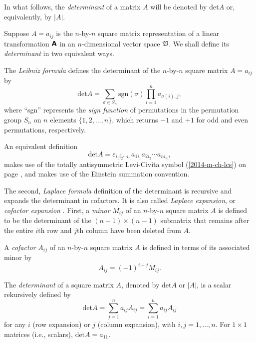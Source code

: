 In what follows, the {\em determinant} of a matrix $A$ will be denoted by $\textrm{det} A$ or,
equivalently, by $\vert A \vert$.

Suppose $A=a_{ij}$ is the  $n$-by-$n$ square matrix representation of
a linear transformation $\textsf{\textbf{A}}$
in an $n$-dimensional vector space ${\frak V}$.
We shall define its {\em determinant}
in two equivalent ways.


The
{\em Leibniz formula}
 defines the determinant of the $n$-by-$n$ square matrix  $A=a_{ij}$ by
\begin{equation}
\textrm{det}A
=\sum_{\sigma \in S_n} \textrm{sgn}(\sigma) \prod_{i=1}^n a_{\sigma(i),j} ,
\end{equation}
where ``sgn'' represents the {\em sign function}
of permutations in the permutation group $S_n$
on $n$ elements $\{1,2, \ldots , n\}$,
which returns $-1$ and $+1$ for odd and even permutations,
respectively.

An equivalent definition
\begin{equation}
\textrm{det}A
=\varepsilon_{i_1 i_2\cdots i_n} a_{1i_1}a_{2i_2} \cdots a_{ni_n},
\end{equation}
makes use of the  totally antisymmetric Levi-Civita symbol  (\ref{2014-m-ch-lcs}) on page \pageref{2014-m-ch-lcs},
 and makes use of the
 Einstein summation convention.


The second,
{\em Laplace formula}
definition of the determinant
is recursive and expands the determinant in cofactors.
It is also called
{\em Laplace expansion},
or
{\em cofactor expansion}
.
First,
a {\em minor}
$M_{ij}$ of an  $n$-by-$n$ square matrix  $A$ is
defined to be the determinant of the
$(n-1)\times (n-1)$ submatrix
that remains after the entire $i$th row and $j$th column have been deleted from $A$.

A {\em cofactor}
$A_{ij}$
of an $n$-by-$n$ square matrix  $A$
is defined in terms of its associated minor by
\begin{equation}
A_{ij}=(-1)^{i+j}M_{ij}.
\end{equation}

The {\em determinant} of a square matrix $A$, denoted by
$\textrm{det} A$ or $\vert A\vert$, is a scalar rekursively defined by
\begin{equation}
\textrm{det}A
=\sum_{j=1}^n a_{ij}A_{ij}
=\sum_{i=1}^n a_{ij}A_{ij}
\end{equation}
for any $i$ (row expansion) or $j$ (column expansion), with $i,j=1,\ldots ,n$.
For $1\times 1$ matrices (i.e., scalars), $\textrm{det}A =a_{11}$.

